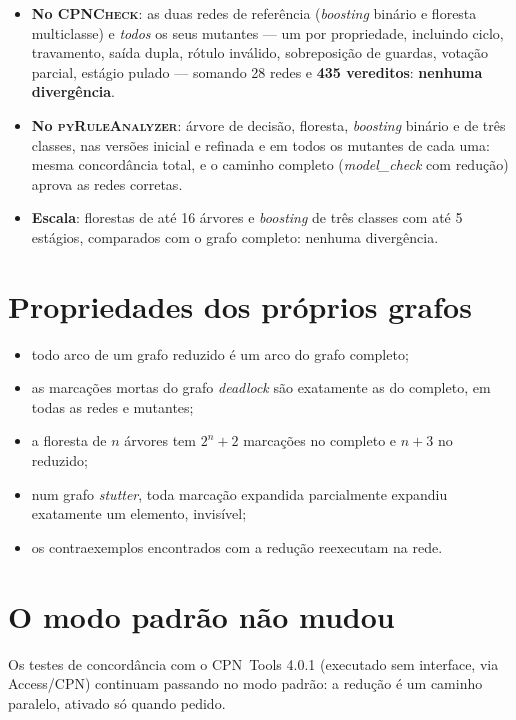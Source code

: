 \documentclass[11pt,a4paper]{report}
\newcommand{\cpn}{\textsc{CPNCheck}}
\newcommand{\pyra}{\textsc{pyRuleAnalyzer}}
\newcommand{\cpntools}{CPN~Tools}
\theoremstyle{definition}
\begin{document}
\begin{itemize}[leftmargin=1.4em]
  \item \textbf{No \cpn{}}: as duas redes de referência (\emph{boosting}
        binário e floresta multiclasse) e \emph{todos} os seus mutantes --- um
        por propriedade, incluindo ciclo, travamento, saída dupla, rótulo
        inválido, sobreposição de guardas, votação parcial, estágio pulado ---
        somando 28 redes e \textbf{435 vereditos}: \textbf{nenhuma
        divergência}.
  \item \textbf{No \pyra{}}: árvore de decisão, floresta, \emph{boosting}
        binário e de três classes, nas versões inicial e refinada e em todos
        os mutantes de cada uma: mesma concordância total, e o caminho completo
        (\emph{model\_check} com redução) aprova as redes corretas.
  \item \textbf{Escala}: florestas de até 16 árvores e \emph{boosting} de três
        classes com até 5 estágios, comparados com o grafo completo: nenhuma
        divergência.
\end{itemize}

\section{Propriedades dos próprios grafos}

\begin{itemize}[leftmargin=1.4em]
  \item todo arco de um grafo reduzido é um arco do grafo completo;
  \item as marcações mortas do grafo \emph{deadlock} são exatamente as do
        completo, em todas as redes e mutantes;
  \item a floresta de $n$ árvores tem $2^n+2$ marcações no completo e $n+3$ no
        reduzido;
  \item num grafo \emph{stutter}, toda marcação expandida parcialmente
        expandiu exatamente um elemento, invisível;
  \item os contraexemplos encontrados com a redução reexecutam na rede.
\end{itemize}

\section{O modo padrão não mudou}

Os testes de concordância com o \cpntools{} 4.0.1 (executado sem interface,
via Access/CPN) continuam passando no modo padrão: a redução é um caminho
paralelo, ativado só quando pedido.
\end{document}
